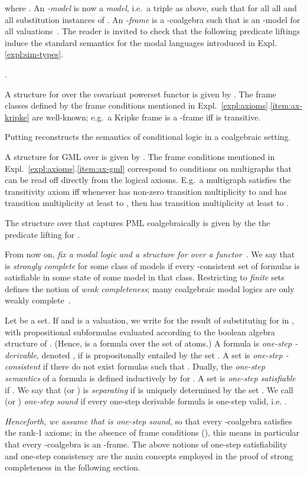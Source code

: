 \documentclass[proceedings]{stacs}
\theoremstyle{definition}
\theoremstyle{plain}
\newcounter{blubber}
\newenvironment{sparenumerate}
{\begin{list}
  {\arabic{blubber}.}
  {\usecounter{blubber}
   \setlength{\leftmargin}{0pt}
    \setlength{\parsep}{0pt}
    \setlength{\itemindent}{3ex}
    \setlength{\itemsep}{2pt}   
    \setlength{\listparindent}{3ex}
  }
}
{\end{list}}
\begin{document}
where .
An \emph{-model} is now a \emph{model}, i.e.\ a triple  as above, such that  for
all all  and all substitution instances  of .  An \emph{-frame} is a -coalgebra  such that
 is an -model for all valuations~.  The
reader is invited to check that the following predicate liftings
induce the standard semantics for the modal languages introduced in
Expl. \ref{expl:sim-types}.
\begin{exas}\label{expl:structure}
\begin{sparenumerate}
\item A structure for  over the covariant powerset functor
   is given by . The frame classes defined by the frame
  conditions mentioned in Expl.~\ref{expl:axioms}.\ref{item:ax-kripke}
  are well-known; e.g.\ a Kripke frame  is a -frame iff 
  is transitive.
\item Putting  reconstructs the semantics of conditional
  logic in a coalgebraic setting. 
\item\label{item:gml-struct} A structure for GML over
   is given by . The frame conditions mentioned in
  Expl.~\ref{expl:axioms}.\ref{item:ax-gml} correspond to conditions
  on multigraphs that can be read off directly from the logical
  axioms. E.g.\ a multigraph satisfies the transitivity axiom  iff whenever  has non-zero
  transition multiplicity to  and  has transition multiplicity
  at least  to , then  has transition multiplicity at least
   to .
\item The structure over  that captures PML coalgebraically is
  given by the the predicate lifting  for .
\end{sparenumerate}
\end{exas}
\noindent From now on, \emph{fix a modal logic  and a structure for  over a functor~}. 
We say that  is \emph{strongly complete} for some class of
models if every -consistent set of formulas is satisfiable in
some state of some model in that class. Restricting to \emph{finite}
sets  defines the notion of \emph{weak completeness}; many
coalgebraic modal logics are only weakly complete~\cite{Schroder07}.
\begin{defi}
  Let  be a set. If  and  is a valuation, we write  for the result of
  substituting  for  in , with propositional
  subformulas evaluated according to the boolean algebra structure of
  . (Hence,  is a formula over the set  of
  atoms.)  A formula  is
  \emph{one-step -derivable}, denoted ,
  if  is propositonally entailed by the set . A set  is \emph{one-step
    -consistent} if there do not exist formulas  such that . Dually, the \emph{one-step
    semantics}  of a formula  is defined inductively by  for
  . A set  is \emph{one-step satisfiable} if
  .  We
  say that  (or ) is \emph{separating} if  is
  uniquely determined by the set . We call  (or ) \emph{one-step
    sound} if every one-step derivable formula  is one-step valid, i.e. .
\end{defi}
\noindent \emph{Henceforth, we assume that  is one-step sound},
so that every -coalgebra satisfies the rank-1 axioms; in the
absence of frame conditions (), this means in
particular that every -coalgebra is an -frame. The above
notions of one-step satisfiability and one-step consistency are the
main concepts employed in the proof of strong completeness in the
following section. 
\end{document}
